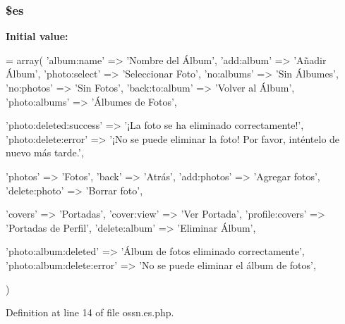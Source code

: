 \subsubsection[{\texorpdfstring{\$es}{$es}}]{\setlength{\rightskip}{0pt plus 5cm}\$es}\hypertarget{components_2_ossn_photos_2locale_2ossn_8es_8php_a388cbda27103d2baee3997798d1f2744}{}\label{components_2_ossn_photos_2locale_2ossn_8es_8php_a388cbda27103d2baee3997798d1f2744}
{\bfseries Initial value\+:}
\begin{DoxyCode}
= array(
    \textcolor{stringliteral}{'album:name'} => \textcolor{stringliteral}{'Nombre del Álbum'},
    \textcolor{stringliteral}{'add:album'} => \textcolor{stringliteral}{'Añadir Álbum'},
    \textcolor{stringliteral}{'photo:select'} => \textcolor{stringliteral}{'Seleccionar Foto'},
    \textcolor{stringliteral}{'no:albums'} => \textcolor{stringliteral}{'Sin Álbumes'},
    \textcolor{stringliteral}{'no:photos'} => \textcolor{stringliteral}{'Sin Fotos'},
    \textcolor{stringliteral}{'back:to:album'} => \textcolor{stringliteral}{'Volver al Álbum'},
    \textcolor{stringliteral}{'photo:albums'} => \textcolor{stringliteral}{'Álbumes de Fotos'},
    
    \textcolor{stringliteral}{'photo:deleted:success'} => \textcolor{stringliteral}{'¡La foto se ha eliminado correctamente!'},
    \textcolor{stringliteral}{'photo:delete:error'} => \textcolor{stringliteral}{'¡No se puede eliminar la foto! Por favor, inténtelo de nuevo más tarde.'},
    
    \textcolor{stringliteral}{'photos'} => \textcolor{stringliteral}{'Fotos'},
    \textcolor{stringliteral}{'back'} => \textcolor{stringliteral}{'Atrás'},
    \textcolor{stringliteral}{'add:photos'} => \textcolor{stringliteral}{'Agregar fotos'},
    \textcolor{stringliteral}{'delete:photo'} => \textcolor{stringliteral}{'Borrar foto'},
    
    \textcolor{stringliteral}{'covers'} => \textcolor{stringliteral}{'Portadas'},
    \textcolor{stringliteral}{'cover:view'} => \textcolor{stringliteral}{'Ver Portada'},
    \textcolor{stringliteral}{'profile:covers'} => \textcolor{stringliteral}{'Portadas de Perfil'},
    \textcolor{stringliteral}{'delete:album'} => \textcolor{stringliteral}{'Eliminar Álbum'},
    
    \textcolor{stringliteral}{'photo:album:deleted'} => \textcolor{stringliteral}{'Álbum de fotos eliminado correctamente'},
    \textcolor{stringliteral}{'photo:album:delete:error'} => \textcolor{stringliteral}{'No se puede eliminar el álbum de fotos'},
    

)
\end{DoxyCode}


Definition at line 14 of file ossn.\+es.\+php.

